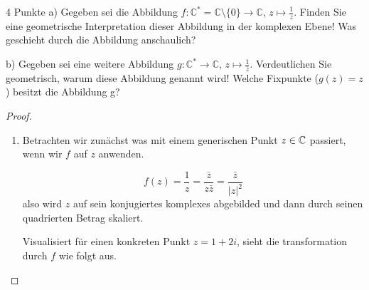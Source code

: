 \documentclass{problemset}
\begin{document}
\begin{problem}[Einheitskreis]{4 Punkte}
a) Gegeben sei die Abbildung $f : \mathbb{C}^* = \mathbb{C} \setminus \{0\} \rightarrow \mathbb{C}$, $z \mapsto \frac{1}{z}$. Finden Sie eine geometrische Interpretation dieser Abbildung in der komplexen Ebene! Was geschieht durch die Abbildung anschaulich?

b) Gegeben sei eine weitere Abbildung $g : \mathbb{C}^* \rightarrow
\mathbb{C}$, $z \mapsto \frac{1}{\overline{z}}$. Verdeutlichen Sie geometrisch,
warum diese Abbildung  genannt
wird! Welche Fixpunkte ($g(z) = z$) besitzt die Abbildung g?

\begin{proof}
    \leavevmode
    \begin{enumerate}
        \item Betrachten wir zunächst was mit einem generischen Punkt $z \in
              \mathbb{C}$ passiert, wenn wir $f$ auf $z$ anwenden.

              \[
                  f(z) = \frac{1}{z} = \frac{\bar{z}}{z \bar{z}} = \frac{\bar{z}}{{|z|}^2}
              \] also wird $z$ auf sein konjugiertes komplexes abgebilded und
                 dann durch seinen quadrierten Betrag skaliert.

              Visualisiert für einen konkreten Punkt $z = 1 + 2i$, sieht die
              transformation durch $f$ wie folgt aus.

              \begin{center}
              \end{center}


\end{enumerate}
\end{proof}
\end{problem}
\end{document}

